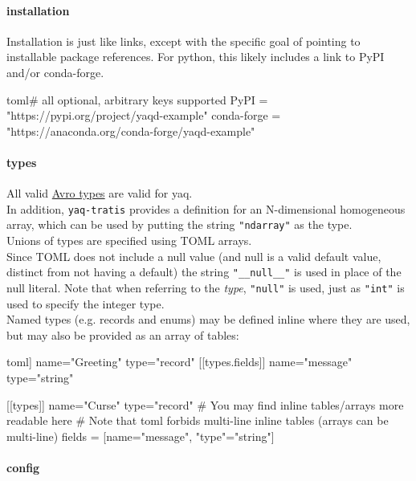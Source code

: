\hypertarget{installation-1}{%
\paragraph{installation}\label{installation-1}}

Installation is just like links, except with the specific goal of
pointing to installable package references. For python, this likely
includes a link to PyPI and/or conda-forge.

\begin{codefragment}{toml}\noop
[installation]  # all optional, arbitrary keys supported
PyPI = "https://pypi.org/project/yaqd-example"
conda-forge = "https://anaconda.org/conda-forge/yaqd-example"
\end{codefragment}

\hypertarget{types}{%
\paragraph{types}\label{types}}

All valid
\href{https://avro.apache.org/docs/current/spec.html\#schemas}{Avro
types} are valid for yaq.\\
In addition, \texttt{yaq-tratis} provides a definition for an
N-dimensional homogeneous array, which can be used by putting the string
\texttt{"ndarray"} as the type.\\
Unions of types are specified using TOML arrays.\\
Since TOML does not include a null value (and null is a valid default
value, distinct from not having a default) the string
\texttt{"\_\_null\_\_"} is used in place of the null literal. Note that
when referring to the \emph{type}, \texttt{"null"} is used, just as
\texttt{"int"} is used to specify the integer type.\\
Named types (e.g. records and enums) may be defined inline where they
are used, but may also be provided as an array of tables:

\begin{codefragment}{toml}\noop
[[types]]
name="Greeting"
type="record"
[[types.fields]]
name="message"
type="string"

[[types]]
name="Curse"
type="record"
# You may find inline tables/arrays more readable here
# Note that toml forbids multi-line inline tables (arrays can be multi-line)
fields = [{name="message", "type"="string"}]
\end{codefragment}

\hypertarget{config}{%
\paragraph{config}\label{config}}

